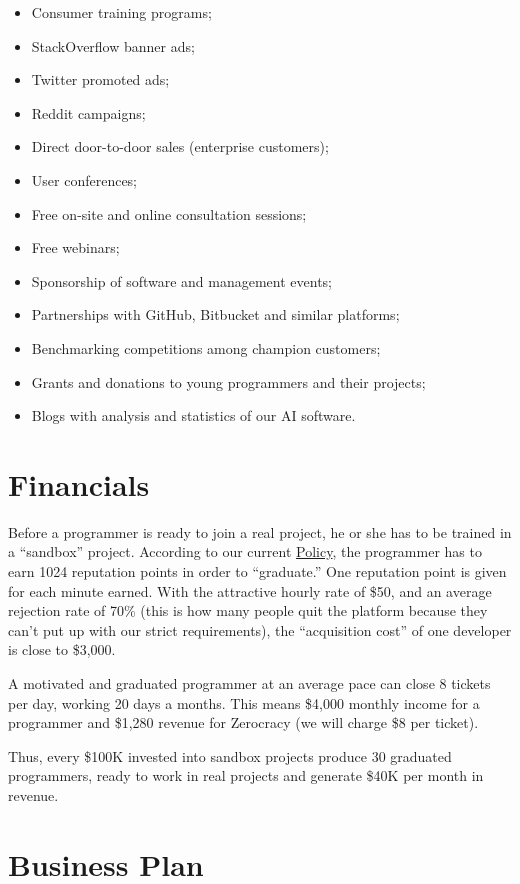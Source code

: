 \documentclass{main}
\begin{document}
\begin{itemize}\itemsep0em
  \item Consumer training programs;
  \item StackOverflow banner ads;
  \item Twitter promoted ads;
  \item Reddit campaigns;
  \item Direct door-to-door sales (enterprise customers);
  \item User conferences;
  \item Free on-site and online consultation sessions;
  \item Free webinars;
  \item Sponsorship of software and management events;
  \item Partnerships with GitHub, Bitbucket and similar platforms;
  \item Benchmarking competitions among champion customers;
  \item Grants and donations to young programmers and their projects;
  \item Blogs with analysis and statistics of our AI software.
\end{itemize}

\section{Financials}

Before a programmer is ready to join a real project, he or she has to be
trained in a ``sandbox'' project. According to our current \href{http://www.zerocracy.com/policy.html}{Policy},
the programmer has to earn 1024 reputation points in order to ``graduate.''
One reputation point is given for each minute earned. With the attractive
hourly rate of \$50, and an average rejection rate of 70\% (this is how many
people quit the platform because they can't put up with our strict requirements),
the ``acquisition cost'' of one developer is close to \$3,000.

A motivated and graduated programmer at an average pace can close 8 tickets per day,
working 20 days a months. This means \$4,000 monthly income for a programmer
and \$1,280 revenue for Zerocracy (we will charge \$8 per ticket).

Thus, every \$100K invested into sandbox projects produce 30 graduated programmers,
ready to work in real projects and generate \$40K per month in revenue.

\section{Business Plan}
\end{document}
